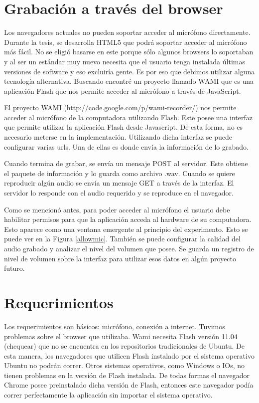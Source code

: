 \documentclass[11pt,a4paper,twoside]{tesis}
\begin{document}

\section{Grabación a través del browser}

Los navegadores actuales no pueden soportar acceder al micrófono directamente. Durante la tesis, se desarrolla HTML5 que podrá soportar acceder al micrófono más fácil. No se eligió basarse en este porque sólo algunos browsers lo soportaban y al ser un estándar muy nuevo necesita que el usuario tenga instalada últimas versiones de software y eso excluiría gente. Es por eso que debimos utilizar alguna tecnología alternativa. Buscando encontré un proyecto llamado WAMI que es una aplicación Flash que nos permite acceder al micrófono a través de JavaScript. 

El proyecto WAMI (http://code.google.com/p/wami-recorder/) nos permite acceder al micrófono de la computadora utilizando Flash. Este posee una interfaz que permite utilizar la aplicación Flash desde Javascript. De esta forma, no es necesario meterse en la implementación. Utilizando dicha interfaz se puede configurar varias urls. Una de ellas es donde envía la información de lo grabado.

Cuando termina de grabar, se envía un mensaje POST al servidor. Este obtiene el paquete de información y lo guarda como archivo .wav. Cuando se quiere reproducir algún audio se envía un mensaje GET a través de la interfaz. El servidor lo responde con el audio requerido y se reproduce en el navegador. 

Como se mencionó antes, para poder acceder al micrófono el usuario debe habilitar permisos para que la aplicación acceda al hardware de su computadora. Esto aparece como una ventana emergente al principio del experimento. Esto se puede ver en la Figura \ref{allowmic}. También se puede configurar la calidad del audio grabado y analizar el nivel del volumen que posee. Se guarda un registro de nivel de volumen sobre la interfaz para utilizar esos datos en algún proyecto futuro.

\section{Requerimientos}

Los requerimientos son básicos: micrófono, conexión a internet. 
Tuvimos problemas sobre el browser que utilizaba. Wami necesita Flash versión 11.04 (chequear) que no se encuentra en los repositorios tradicionales de Ubuntu. De esta manera, los navegadores que utilicen Flash instalado por el sistema operativo Ubuntu no podrán correr. Otros sistemas operativos, como Windows o IOs, no tienen problemas en la versión de Flash instalada. De todas formas el navegador Chrome posee preinstalado dicha versión de Flash, entonces este navegador podía correr perfectamente la aplicación sin importar el sistema operativo.
\end{document}

